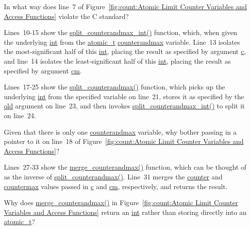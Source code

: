 \QuickQuiz{}
	In what way does line~7 of
	Figure~\ref{fig:count:Atomic Limit Counter Variables and Access Functions}
	violate the C standard?
 \QuickQuizEnd

Lines~10-15 show the \url{split_counterandmax_int()} function, which,
when given the underlying \url{int} from the \url{atomic_t}
\url{counterandmax} variable.
Line~13 isolates the most-significant half of this \url{int},
placing the result as specified by argument \url{c},
and line~14 isolates the least-significant half of this \url{int},
placing the result as specified by argument \url{cm}.

Lines~17-25 show the \url{split_counterandmax()} function, which
picks up the underlying \url{int} from the specified variable
on line~21, stores it as specified by the \url{old} argument on
line~23, and then invokes \url{split_counterandmax_int()} to split
it on line~24.

\QuickQuiz{}
	Given that there is only one \url{counterandmax} variable,
	why bother passing in a pointer to it on line~18 of
	Figure~\ref{fig:count:Atomic Limit Counter Variables and Access Functions}?
 \QuickQuizEnd

Lines~27-33 show the \url{merge_counterandmax()} function, which
can be thought of as the inverse of \url{split_counterandmax()}.
Line~31 merges the \url{counter} and \url{countermax}
values passed in \url{c} and \url{cm}, respectively, and returns
the result.

\QuickQuiz{}
	Why does \url{merge_counterandmax()} in
	Figure~\ref{fig:count:Atomic Limit Counter Variables and Access Functions}
	return an \url{int} rather than storing directly into an
	\url{atomic_t}?
 \QuickQuizEnd

